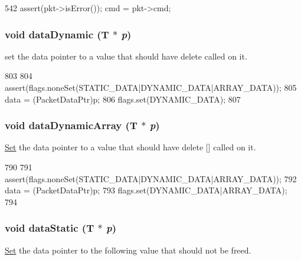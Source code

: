 \begin{DoxyCode}
542 { assert(pkt->isError()); cmd = pkt->cmd; }
\end{DoxyCode}
\hypertarget{classPacket_a970b12a3c3c7fe790502959ffe561eda}{
\subsubsection[{dataDynamic}]{\setlength{\rightskip}{0pt plus 5cm}void dataDynamic (T $\ast$ {\em p})}}
\label{classPacket_a970b12a3c3c7fe790502959ffe561eda}
set the data pointer to a value that should have delete called on it. 


\begin{DoxyCode}
803     {
804         assert(flags.noneSet(STATIC_DATA|DYNAMIC_DATA|ARRAY_DATA));
805         data = (PacketDataPtr)p;
806         flags.set(DYNAMIC_DATA);
807     }
\end{DoxyCode}
\hypertarget{classPacket_ae02c6b2e23b2a5b138c85fcf91fd818d}{
\subsubsection[{dataDynamicArray}]{\setlength{\rightskip}{0pt plus 5cm}void dataDynamicArray (T $\ast$ {\em p})}}
\label{classPacket_ae02c6b2e23b2a5b138c85fcf91fd818d}
\hyperlink{classSet}{Set} the data pointer to a value that should have delete \mbox{[}\mbox{]} called on it. 


\begin{DoxyCode}
790     {
791         assert(flags.noneSet(STATIC_DATA|DYNAMIC_DATA|ARRAY_DATA));
792         data = (PacketDataPtr)p;
793         flags.set(DYNAMIC_DATA|ARRAY_DATA);
794     }
\end{DoxyCode}
\hypertarget{classPacket_a60621b00d6ecd49b3e336087aca2eda0}{
\subsubsection[{dataStatic}]{\setlength{\rightskip}{0pt plus 5cm}void dataStatic (T $\ast$ {\em p})}}
\label{classPacket_a60621b00d6ecd49b3e336087aca2eda0}
\hyperlink{classSet}{Set} the data pointer to the following value that should not be freed. 


